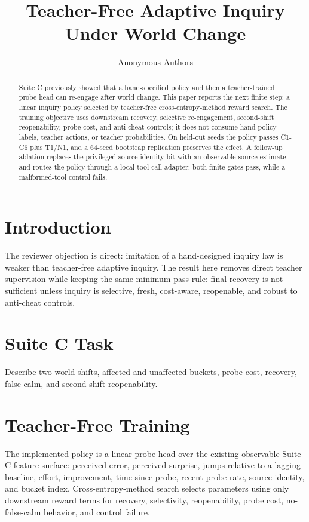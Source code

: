 \documentclass[10pt,twocolumn]{article}
\title{Teacher-Free Adaptive Inquiry Under World Change}
\author{Anonymous Authors}
\date{}
\begin{document}
\maketitle

\begin{abstract}
Suite C previously showed that a hand-specified policy and then a
teacher-trained probe head can re-engage after world change. This paper reports
the next finite step: a linear inquiry policy selected by teacher-free
cross-entropy-method reward search. The training objective uses downstream
recovery, selective re-engagement, second-shift reopenability, probe cost, and
anti-cheat controls; it does not consume hand-policy labels, teacher actions, or
teacher probabilities. On held-out seeds the policy passes C1-C6 plus T1/N1,
and a 64-seed bootstrap replication preserves the effect. A follow-up ablation
replaces the privileged source-identity bit with an observable source estimate
and routes the policy through a local tool-call adapter; both finite gates pass,
while a malformed-tool control fails.
\end{abstract}

\section{Introduction}
The reviewer objection is direct: imitation of a hand-designed inquiry law is
weaker than teacher-free adaptive inquiry. The result here removes direct
teacher supervision while keeping the same minimum pass rule: final recovery is
not sufficient unless inquiry is selective, fresh, cost-aware, reopenable, and
robust to anti-cheat controls.

\section{Suite C Task}
Describe two world shifts, affected and unaffected buckets, probe cost, recovery,
false calm, and second-shift reopenability.

\section{Teacher-Free Training}
The implemented policy is a linear probe head over the existing observable
Suite C feature surface: perceived error, perceived surprise, jumps relative to
a lagging baseline, effort, improvement, time since probe, recent probe rate,
source identity, and bucket index. Cross-entropy-method search selects
parameters using only downstream reward terms for recovery, selectivity,
reopenability, probe cost, no-false-calm behavior, and control failure.
\end{document}
